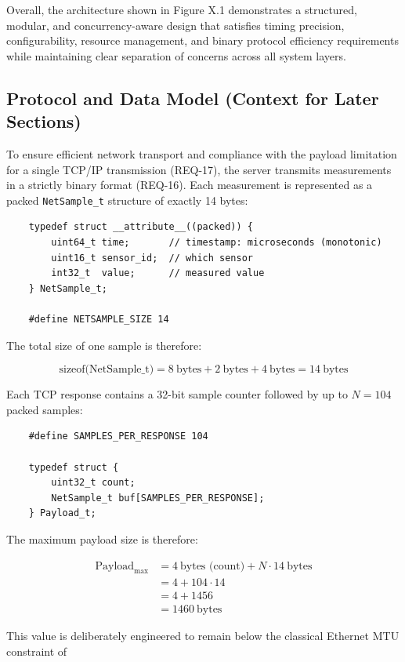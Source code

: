 Overall, the architecture shown in Figure X.1 demonstrates a structured, modular, and concurrency-aware design that satisfies timing precision, configurability, resource management, and binary protocol efficiency requirements while maintaining clear separation of concerns across all system layers.

\subsection{Protocol and Data Model (Context for Later Sections)}
\label{subsec:protocol-model}

To ensure efficient network transport and compliance with the payload limitation for a single TCP/IP transmission (REQ-17), the server transmits measurements in a strictly binary format (REQ-16). Each measurement is represented as a packed \texttt{NetSample\_t} structure of exactly 14 bytes:

\begin{lstlisting}
	typedef struct __attribute__((packed)) {
		uint64_t time;       // timestamp: microseconds (monotonic)
		uint16_t sensor_id;  // which sensor
		int32_t  value;      // measured value
	} NetSample_t;
	
	#define NETSAMPLE_SIZE 14
\end{lstlisting}

The total size of one sample is therefore:

\[
\text{sizeof(NetSample\_t)} =
8~\text{bytes} + 2~\text{bytes} + 4~\text{bytes}
= 14~\text{bytes}
\]

Each TCP response contains a 32-bit sample counter followed by up to
\( N = 104 \) packed samples:

\begin{lstlisting}
	#define SAMPLES_PER_RESPONSE 104
	
	typedef struct {
		uint32_t count;
		NetSample_t buf[SAMPLES_PER_RESPONSE];
	} Payload_t;
\end{lstlisting}

The maximum payload size is therefore:

\[
\begin{aligned}
	\text{Payload}_{\max}
	&= 4~\text{bytes (count)} + N \cdot 14~\text{bytes} \\
	&= 4 + 104 \cdot 14 \\
	&= 4 + 1456 \\
	&= 1460~\text{bytes}
\end{aligned}
\]

This value is deliberately engineered to remain below the classical
Ethernet MTU constraint of

